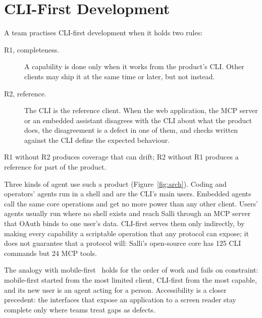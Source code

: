 \documentclass[sigconf,nonacm]{acmart}
\newcommand{\sysA}{Salli}
\begin{document}
\section{CLI-First Development}
\label{sec:principle}

A team practises CLI-first development when it holds two rules:
\begin{description}
\item[R1, completeness.] A capability is done only when it works from the product's CLI. Other clients may ship it at the same time or later, but not instead.
\item[R2, reference.] The CLI is the reference client. When the web application, the MCP server or an embedded assistant disagrees with the CLI about what the product does, the disagreement is a defect in one of them, and checks written against the CLI define the expected behaviour.
\end{description}
R1 without R2 produces coverage that can drift; R2 without R1 produces a reference for part of the product.

Three kinds of agent use such a product (Figure~\ref{fig:arch}). Coding and operators' agents run in a shell and are the CLI's main users. Embedded agents call the same core operations and get no more power than any other client. Users' agents usually run where no shell exists and reach \sysA{} through an MCP server that OAuth binds to one user's data. CLI-first serves them only indirectly, by making every capability a scriptable operation that any protocol can expose; it does not guarantee that a protocol will: \sysA{}'s open-source core has 125 CLI commands but 24 MCP tools.

The analogy with mobile-first~\cite{wroblewski2009mobile,wroblewski2011mobile} holds for the order of work and fails on constraint: mobile-first started from the most limited client, CLI-first from the most capable, and its new user is an agent acting for a person. Accessibility is a closer precedent: the interfaces that expose an application to a screen reader stay complete only where teams treat gaps as defects.
\end{document}
